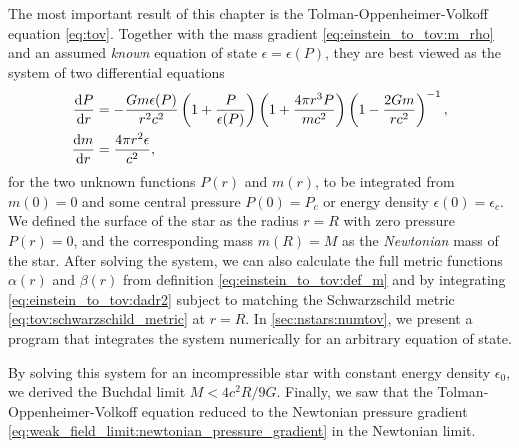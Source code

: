 The most important result of this chapter is the Tolman-Oppenheimer-Volkoff equation \eqref{eq:tov}.
Together with the mass gradient \eqref{eq:einstein_to_tov:m_rho} and an assumed \emph{known} equation of state $\epsilon = \epsilon(P)$, they are best viewed as the system of two differential equations
\begin{subequations}
\label{eq:tov:tovsys}
\begin{align}
	\odv{P}{r} &= -\frac{G m \epsilon(P)}{r^2 c^2} \left( 1 + \frac{P}{\epsilon(P)} \right) \left( 1 + \frac{4 \pi r^3 P}{m c^2} \right) \left( 1 - \frac{2 G m}{r c^2} \right)^{-1} , \label{eq:tov:tovsys_pressure} \\
	\odv{m}{r} &= \frac{4 \pi r^2 \epsilon}{c^2} , \label{eq:tov:tovsys_mass}
\end{align}
\end{subequations}
for the two unknown functions $P(r)$ and $m(r)$, to be integrated from $m(0) = 0$ and some central pressure $P(0) = P_c$ or energy density $\epsilon(0) = \epsilon_c$.
We defined the surface of the star as the radius $r=R$ with zero pressure $P(r) = 0$, and the corresponding mass $m(R) = M$ as the \emph{Newtonian} mass of the star.
After solving the system, we can also calculate the full metric functions $\alpha(r)$ and $\beta(r)$ from definition \eqref{eq:einstein_to_tov:def_m} and by integrating \cref{eq:einstein_to_tov:dadr2} subject to matching the Schwarzschild metric \eqref{eq:tov:schwarzschild_metric} at $r=R$.
In \cref{sec:nstars:numtov}, we present a program that integrates the system numerically for an arbitrary equation of state.

By solving this system for an incompressible star with constant energy density $\epsilon_0$, we derived the Buchdal limit $M < 4 c^2 R / 9 G$.
Finally, we saw that the Tolman-Oppenheimer-Volkoff equation reduced to the Newtonian pressure gradient \eqref{eq:weak_field_limit:newtonian_pressure_gradient} in the Newtonian limit.
